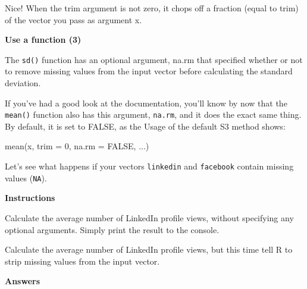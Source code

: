\documentclass[]{article}
\newcommand{\hlnum}[1]{\textcolor[rgb]{0.816,0.125,0.439}{#1}}%
\newcommand{\hlstr}[1]{\textcolor[rgb]{0.251,0.627,0.251}{#1}}%
\newcommand{\hlstd}[1]{\textcolor[rgb]{0.251,0.251,0.251}{#1}}%
\newcommand{\hlkwc}[1]{\textcolor[rgb]{0.251,0.251,0.251}{#1}}%
\newcommand{\hlkwd}[1]{\textcolor[rgb]{0.878,0.439,0.125}{#1}}%
\newenvironment{Shaded}{\begin{myshaded}}{\end{myshaded}}
\newcommand{\KeywordTok}[1]{\hlkwd{#1}}
\newcommand{\DataTypeTok}[1]{\hlkwc{#1}}
\newcommand{\DecValTok}[1]{\hlnum{#1}}
\newcommand{\StringTok}[1]{\hlstr{#1}}
\newcommand{\OtherTok}[1]{{#1}}
\newcommand{\NormalTok}[1]{\hlstd{#1}}
\begin{document}
Nice! When the trim argument is not zero, it chops off a fraction (equal
to trim) of the vector you pass as argument x.

\textbf{Use a function (3)}

The \texttt{sd()} function has an optional argument, na.rm that
specified whether or not to remove missing values from the input vector
before calculating the standard deviation.

If you've had a good look at the documentation, you'll know by now that
the \texttt{mean()} function also has this argument, \texttt{na.rm}, and
it does the exact same thing. By default, it is set to FALSE, as the
Usage of the default S3 method shows:

\begin{Shaded}
\begin{Highlighting}[]
\KeywordTok{mean}\NormalTok{(x, }\DataTypeTok{trim =} \DecValTok{0}\NormalTok{, }\DataTypeTok{na.rm =} \OtherTok{FALSE}\NormalTok{, ...)}
\end{Highlighting}
\end{Shaded}

Let's see what happens if your vectors \texttt{linkedin} and
\texttt{facebook} contain missing values (\texttt{NA}).

\textbf{Instructions}

\begin{Shaded}
\begin{Highlighting}[]

\OperatorTok{*}\StringTok{ }\NormalTok{Calculate the average number of LinkedIn profile views, without specifying any optional arguments. Simply print the result to the console.}

\OperatorTok{*}\StringTok{ }\NormalTok{Calculate the average number of LinkedIn profile views, but this time tell R to strip missing values from the input vector.}
\end{Highlighting}
\end{Shaded}

\textbf{Answers}
\end{document}
